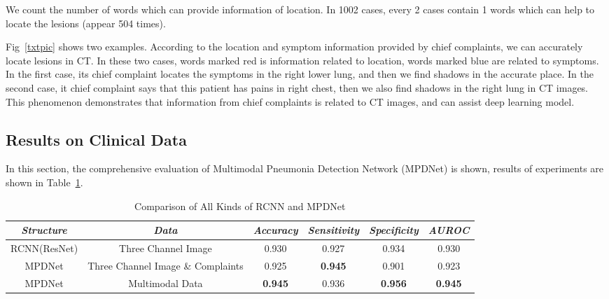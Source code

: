 \documentclass[journal]{IEEEtran}
\begin{document}
We count the number of words which can provide information of location. In 1002 cases, every 2 cases contain 1 words which can help to locate the lesions (appear 504 times). 

Fig~\ref{txtpic} shows two examples. According to the location and symptom information provided by chief complaints, we can accurately locate lesions in CT. 
In these two cases, words marked red is information related to location, words marked blue are related to symptoms. In the first case, its chief complaint locates the symptoms in the right lower lung, and then we find shadows in the accurate place. In the second case, it chief complaint says that this patient has pains in right chest, then we also find shadows in the right lung in CT images.
This phenomenon demonstrates that information from chief complaints is related to CT images, and can assist deep learning model.

\subsection{Results on Clinical Data}
\label{results}
In this section, the comprehensive evaluation of Multimodal Pneumonia Detection Network (MPDNet) is shown, results of experiments are shown in Table~\ref{mpdnetres}.
\begin{table}[htb]
    \label{mpdnetres}

    \caption{Comparison of All Kinds of RCNN and MPDNet}
    \begin{center}
    \begin{tabular}{c|c|c|c|c|c}

    \hline
    \textbf{\textit{Structure}} & \textbf{\textit{Data}}& \textbf{\textit{Accuracy}}  & \textbf{\textit{Sensitivity}} & \textbf{\textit{Specificity}} & \textbf{\textit{AUROC}}\\
    \hline
    RCNN(ResNet) & Three Channel Image&  0.930 & 0.927 &  0.934 &  0.930 \\
    MPDNet & Three Channel Image \& Complaints & 0.925 & {\bfseries 0.945} & 0.901 & 0.923 \\
    MPDNet & Multimodal Data&  {\bfseries 0.945} & 0.936 & {\bfseries 0.956} & {\bfseries 0.945} \\
    \hline

    \end{tabular}
    \vspace{-0cm}
    \end{center}
    \vspace{-0cm}
    \end{table}
\end{document}
